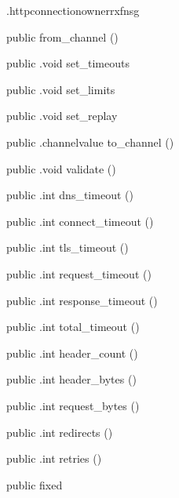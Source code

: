 \begin{CrexxClass}{.httpconnectionowner}{rxfnsg}
\begin{Members}
    \Factory
      {public}
      {from\_channel}
      {()}

    \Method
      {public}
      {.void}
      {set\_timeouts}
      {}

    \Method
      {public}
      {.void}
      {set\_limits}
      {}

    \Method
      {public}
      {.void}
      {set\_replay}
      {}

    \Method
      {public}
      {.channelvalue}
      {to\_channel}
      {()}

    \Method
      {public}
      {.void}
      {validate}
      {()}

    \Method
      {public}
      {.int}
      {dns\_timeout}
      {()}

    \Method
      {public}
      {.int}
      {connect\_timeout}
      {()}

    \Method
      {public}
      {.int}
      {tls\_timeout}
      {()}

    \Method
      {public}
      {.int}
      {request\_timeout}
      {()}

    \Method
      {public}
      {.int}
      {response\_timeout}
      {()}

    \Method
      {public}
      {.int}
      {total\_timeout}
      {()}

    \Method
      {public}
      {.int}
      {header\_count}
      {()}

    \Method
      {public}
      {.int}
      {header\_bytes}
      {()}

    \Method
      {public}
      {.int}
      {request\_bytes}
      {()}

    \Method
      {public}
      {.int}
      {redirects}
      {()}

    \Method
      {public}
      {.int}
      {retries}
      {()}

    \Factory
      {public}
      {fixed}
      {}


\end{Members}
\end{CrexxClass}
